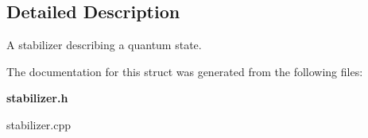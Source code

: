 \subsection{Detailed Description}
A stabilizer describing a quantum state. 



The documentation for this struct was generated from the following files:\begin{CompactItemize}
\item 
{\bf stabilizer.h}\item 
stabilizer.cpp\end{CompactItemize}
